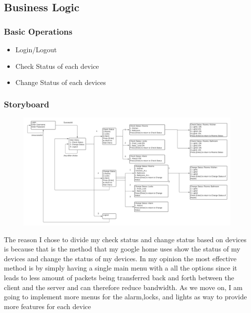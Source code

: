 \documentclass[11pt]{article}
\begin{document}
		\subsection*{Business Logic}
			\subsubsection*{Basic Operations}
				\begin{itemize}
					\item Login/Logout
					\item Check Status of each device
					\item Change Status of each devices
				\end{itemize}
			\subsubsection*{Storyboard}
				\begin{figure}[H]
					\centering
					\includegraphics[scale=0.5]{StoryBoard}
					\caption{}
					\label{fig:storyboard}
				\end{figure}
			The reason I chose to divide my check status and change status  based on devices is because that is the method that my google home uses show the status of my devices and change the status of my devices. In my opinion the most effective method is by simply having a single main menu with a all the options since it leads to less amount of packets being transferred back and forth between the client and the server and can therefore reduce bandwidth.
			As we move on, I am going to implement more menus for the alarm,locks, and lights as way to provide more features for each device
\end{document}
